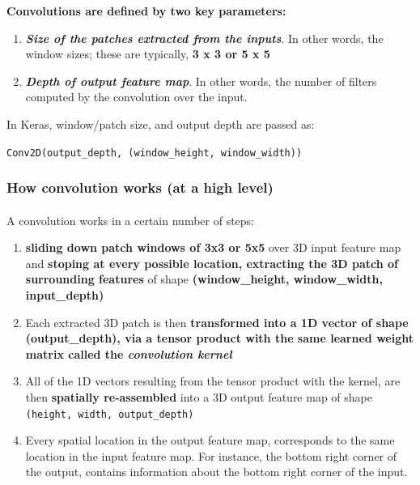 \documentclass[12pt, a4paper]{article}
\begin{document}
\textbf{Convolutions are defined by two key parameters:}
\begin{enumerate}
   \item \textbf{\textit{Size of the patches extracted from the inputs}}.
   In other words, the window sizes; these are typically, \textbf{3 x 3 or 5 x 5}

   \item \textbf{\textit{Depth of output feature map}}. In other words, the number of filters 
   computed by the convolution over the input.
\end{enumerate}

In Keras, window/patch size, and output depth are passed as: \\

{
   \centering
   \lstinline{Conv2D(output_depth, (window_height, window_width))}

}

\subsubsection{How convolution works (at a high level)}
\paragraph*{}
A convolution works in a certain number of steps:
\begin{enumerate}
   \item \textbf{sliding down patch windows of 3x3 or 5x5} over 3D input feature map
   and \textbf{stoping at every possible location, extracting the 3D patch of surrounding features} of shape 
   \textbf{(window\_height, window\_width, input\_depth)}

   \item Each extracted 3D patch is then \textbf{transformed into a 1D vector of shape (output\_depth), via a tensor product
   with the same learned weight matrix called the \textit{convolution kernel}}

   \item All of the 1D vectors resulting from the tensor product with the kernel, are then 
   \textbf{spatially re-assembled} into a 3D output feature map of shape 
   \lstinline{(height, width, output_depth)}

   \item Every spatial location in the output feature map, corresponds to the same location 
   in the input feature map. For instance, the bottom right corner of the output, 
   contains information about the bottom right corner of the input.
\end{enumerate} 
\end{document}
